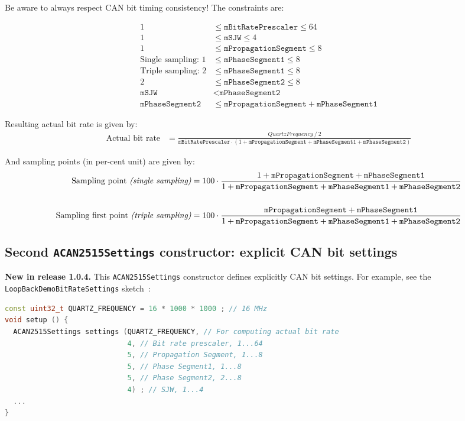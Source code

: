 \documentclass[10pt, a4paper, obeyspaces]{extarticle}
\newcommand \subsectionLabel[2]{\subsection{#1}\label{subsec:#2}}
\begin{document}
Be aware to always respect CAN bit timing consistency! The constraints are:

\begin{align*}
1 & \leqslant \texttt{mBitRatePrescaler} \leqslant 64 \\
1 & \leqslant \texttt{mSJW} \leqslant 4 \\
1 & \leqslant \texttt{mPropagationSegment} \leqslant 8 \\
\text{Single sampling: }1 & \leqslant \texttt{mPhaseSegment1} \leqslant 8\\
\text{Triple sampling: }2 & \leqslant \texttt{mPhaseSegment1} \leqslant 8\\
2 & \leqslant \texttt{mPhaseSegment2} \leqslant 8 \\
\texttt{mSJW} &<\texttt{mPhaseSegment2}\\
\texttt{mPhaseSegment2} & \leqslant \texttt{mPropagationSegment} + \texttt{mPhaseSegment1}
\end{align*}

Resulting actual bit rate is given by:
{\small
\begin{align*}
\text{Actual bit rate} & = \frac{QuartzFrequency~/~2}{\texttt{mBitRatePrescaler} \cdot (1 + \texttt{mPropagationSegment} + \texttt{mPhaseSegment1} + \texttt{mPhaseSegment2})}
\end{align*}
}

And sampling points (in per-cent unit) are given by:
{\small
\begin{align*}
\text{Sampling point {\it(single sampling)}} & = 100 \cdot \frac{1 + \texttt{mPropagationSegment} + \texttt{mPhaseSegment1}}{1 + \texttt{mPropagationSegment} + \texttt{mPhaseSegment1} + \texttt{mPhaseSegment2}}  \\
  & \\
\text{Sampling first point {\it(triple sampling)}} & = 100 \cdot \frac{\texttt{mPropagationSegment} + \texttt{mPhaseSegment1}}{1 + \texttt{mPropagationSegment} + \texttt{mPhaseSegment1} + \texttt{mPhaseSegment2}}
\end{align*}
}




\subsectionLabel{Second \texttt{ACAN2515Settings} constructor: explicit CAN bit settings}{explicitCANbitSettings}

{\bf New in release 1.0.4.} This \texttt{ACAN2515Settings} constructor defines explicitly CAN bit settings. For example, see the \texttt{LoopBackDemoBitRateSettings} sketch~:
{ \small\begin{lstlisting}[language=c++]
const uint32_t QUARTZ_FREQUENCY = 16 * 1000 * 1000 ; // 16 MHz
void setup () {
  ACAN2515Settings settings (QUARTZ_FREQUENCY, // For computing actual bit rate
                             4, // Bit rate prescaler, 1...64
                             5, // Propagation Segment, 1...8
                             5, // Phase Segment1, 1...8
                             5, // Phase Segment2, 2...8
                             4) ; // SJW, 1...4
  ...
}
\end{lstlisting}}
\end{document}
